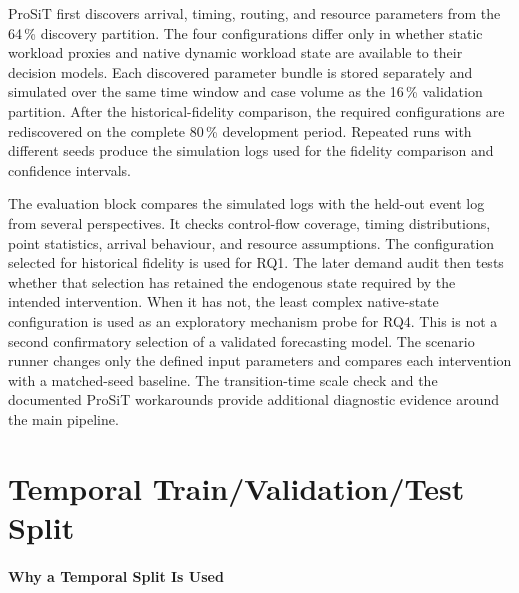 ProSiT first discovers arrival, timing, routing, and resource parameters from
the 64\,\% discovery partition. The four configurations differ only in whether
static workload proxies and native dynamic workload state are available to
their decision models. Each discovered parameter bundle is stored separately
and simulated over the same time window and case volume as the 16\,\%
validation partition. After the historical-fidelity comparison, the required
configurations are rediscovered on the complete 80\,\% development period.
Repeated runs with different seeds produce the simulation logs used for the
fidelity comparison and confidence intervals.

The evaluation block compares the simulated logs with the held-out event log
from several perspectives. It checks control-flow coverage, timing
distributions, point statistics, arrival behaviour, and resource assumptions.
The configuration selected for historical fidelity is used for RQ1. The later
demand audit then tests whether that selection has retained the endogenous
state required by the intended intervention. When it has not, the least complex
native-state configuration is used as an exploratory mechanism probe for RQ4.
This is not a second confirmatory selection of a validated forecasting model.
The scenario runner changes only the defined input parameters and compares each
intervention with a matched-seed baseline.
The transition-time scale check and the documented ProSiT
workarounds provide additional diagnostic evidence around the main pipeline.

\FloatBarrier

\section{Temporal Train/Validation/Test Split}
\label{sec:train_test_split}

\paragraph{Why a Temporal Split Is Used}

